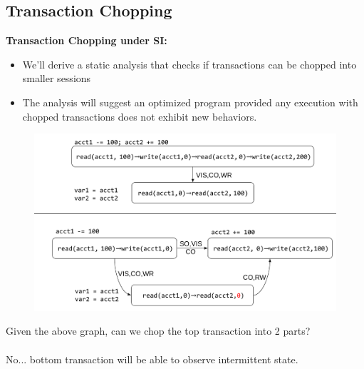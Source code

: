 \documentclass{beamer}
\begin{document}
\subsection{Transaction Chopping}

\begin{frame}
	\textbf{Transaction Chopping under SI:}
	\begin{itemize}
		\item We'll derive a static analysis that checks if transactions can be chopped into smaller sessions
		\item The analysis will suggest an optimized program provided any execution with chopped transactions does not exhibit new behaviors.
	\end{itemize}
\end{frame}

\begin{frame}
	\begin{figure}
		\includegraphics[scale=0.15]{chopping1}
	\end{figure}
	\begin{example}
		Given the above graph, can we chop the top transaction into 2 parts? \\
		\hfill \\
		No... bottom transaction will be able to observe intermittent state.
	\end{example}
\end{frame}
\end{document}
